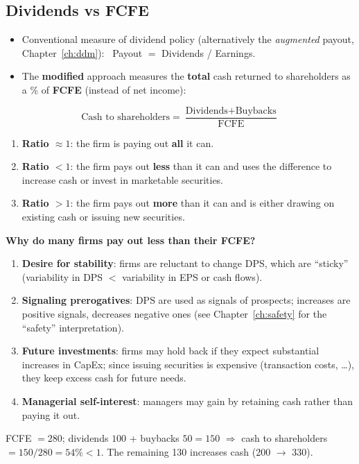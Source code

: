\subsection{Dividends vs FCFE}
\begin{itemize}
  \item Conventional measure of dividend policy (alternatively the \emph{augmented} payout, Chapter~\ref{ch:ddm}): \ Payout $=$ Dividends / Earnings.
  \item The \textbf{modified} approach measures the \textbf{total} cash returned to shareholders as a \% of \textbf{FCFE} (instead of net income):
\end{itemize}
\begin{keybox}
\[
\text{Cash to shareholders}=\frac{\text{Dividends}+\text{Buybacks}}{\text{FCFE}}
\]
\begin{enumerate}[leftmargin=*]
  \item \textbf{Ratio $\approx1$}: the firm is paying out \textbf{all} it can.
  \item \textbf{Ratio $<1$}: the firm pays out \textbf{less} than it can and uses the difference to increase cash or invest in marketable securities.
  \item \textbf{Ratio $>1$}: the firm pays out \textbf{more} than it can and is either drawing on existing cash or issuing new securities.
\end{enumerate}
\end{keybox}
\textbf{Why do many firms pay out less than their FCFE?}
\begin{enumerate}
  \item \textbf{Desire for stability}: firms are reluctant to change DPS, which are ``sticky'' (variability in DPS $<$ variability in EPS or cash flows).
  \item \textbf{Signaling prerogatives}: DPS are used as signals of prospects; increases are positive signals, decreases negative ones (see Chapter~\ref{ch:safety} for the ``safety'' interpretation).
  \item \textbf{Future investments}: firms may hold back if they expect substantial increases in CapEx; since issuing securities is expensive (transaction costs, \dots), they keep excess cash for future needs.
  \item \textbf{Managerial self-interest}: managers may gain by retaining cash rather than paying it out.
\end{enumerate}
\begin{exbox}
FCFE $=280$; dividends $100$ + buybacks $50=150$ $\Rightarrow$ cash to shareholders $=150/280=54\%<1$. The remaining 130 increases cash (200 $\to$ 330).
\end{exbox}

